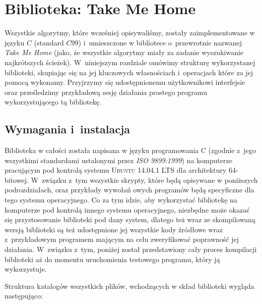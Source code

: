 \chapter{Biblioteka: Take Me Home}
\label{app:takeMeHome}
\thispagestyle{appendixStyle}





Wszystkie algorytmy, które wcześniej opisywaliśmy, zostały zaimplementowane w języku $C$ (standard $C99$) i~umieszczone w bibliotece o~przewrotnie nazwanej \textit{Take Me Home} (jako, że wszystkie algorytmy miały za zadanie wyszukiwanie najkrótszych ścieżek).
W~niniejszym rozdziale omówimy strukturę wykorzystanej biblioteki, skupiając się na jej kluczowych własnościach i~operacjach które za jej pomocą wykonamy.
Przyjrzymy się udostępnionemu użytkownikowi interfejsie oraz prześledzimy przykładową sesję działania prostego programu wykorzystującego tą bibliotekę.




\section{Wymagania i~instalacja}




Biblioteka w całości została napisana w języku programowania \textsc{C} (zgodnie z~jego wszystkimi standardami ustalonymi przez \textit{\textsc{ISO 9899:1999}}) na komputerze pracującym pod kontrolą systemu \textsc{Ubuntu 14.04.1 LTS} dla architektury \textsc{64}-bitowej.
W~związku z~tym wszystkie skrypty, które będą opisywane w poniższych podrozdziałach, oraz przykłady wywołań owych programów będą specyficzne dla tego systemu operacyjnego.
Co za tym idzie, aby wykorzystać bibliotekę na komputerze pod kontrolą innego systemu operacyjnego, niezbędne może okazać się przystosowanie biblioteki pod dany system, dlatego też wraz ze skompilowaną wersją biblioteki są też udostępnione jej wszystkie kody źródłowe wraz z~przykładowym programem mającym na celu zweryfikować poprawność jej działania.
W~związku z~tym, poniżej został przedstawiony cały proces kompilacji biblioteki aż do momentu uruchomienia testowego programu, który ją wykorzystuje.

Struktura katalogów wszystkich plików, wchodzących w skład biblioteki wygląda następująco:


